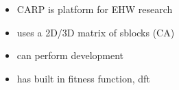 \TODO

\begin{itemize}
    \item CARP is platform for EHW research
    \item uses a 2D/3D matrix of sblocks (CA)
    \item can perform development
    \item has built in fitness function, dft
\end{itemize}

